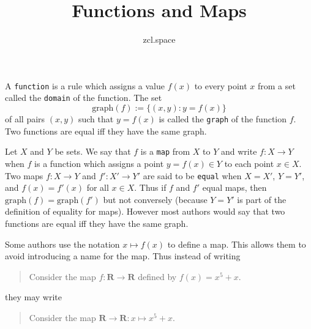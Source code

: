 \documentclass[10pt,a4paper,UTF8]{article}
\author{zcl.space}
\date{}
\title{Functions and Maps}
\begin{document}
\maketitle
\tableofcontents
{}
 A \texttt{function} is a rule which assigns a value
\(f(x)\) to every point \(x\) from a set called the \texttt{domain} of the function.
The set
$$
  \mathrm{graph}(f):=\{(x,y): y=f(x)\}
$$
of all pairs \((x,y)\) such that \(y=f(x)\) is called the \texttt{graph} of the function \(f\).
Two functions are equal iff they have the same graph.

Let \(X\) and \(Y\) be sets.
We say that \(f\) is a \texttt{map}  from \(X\) to \(Y\)
and  write \(f:X\to Y\) when \(f\) is a function which assigns
a point \(y=f(x)\in Y\) to each point \(x\in X\).
Two maps \(f:X\to Y\) and \(f':X'\to Y'\) are
said to be \texttt{equal}
when \(X=X'\), \(Y=Y'\), and \(f(x)=f'(x)\) for all \(x\in X\).
Thus if \(f\) and \(f'\) equal maps, then \(\mathrm{graph}(f)=\mathrm{graph}(f')\)
but not conversely (because \(Y=Y'\) is part of the definition of equality for maps).
However most authors would say that two functions are equal iff they have the same graph.

 Some authors
use the notation \(x\mapsto f(x)\)
to define a map. This allows them to avoid introducing a name for the map. Thus instead of writing
\begin{quote}
Consider the map \(f:\mathbf{R}\to \mathbf{R}\) defined by \(f(x)=x^5+x\).
\end{quote}

they may write
\begin{quote}
Consider the map \(\mathbf{R}\to \mathbf{R}:x\mapsto x^5+x\).
\end{quote}
\end{document}
